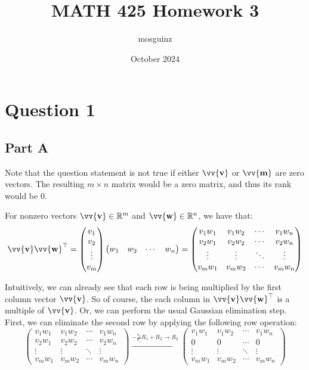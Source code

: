 \documentclass[12pt]{article}
\title{MATH 425 Homework 3}
\author{mosguinz}
\date{October 2024}
\newcommand{\vect}[1]{\vv{\mathbf{#1}}}
\newcommand{\R}{\mathbb{R}}
\begin{document}
\section*{Question 1}

\subsection*{Part A}

Note that the question statement is not true if either $\vect{v}$ or $\vect{m}$ are zero vectors. The resulting $m\times n$ matrix would be a zero matrix, and thus its rank would be $0$.

For nonzero vectors $\vect{v}\in\R^m$ and $\vect{w}\in\R^n$, we have that:
$$
\vect{v}\vect{w}^\top = \begin{pmatrix}
    v_1 \\ v_2 \\ \vdots \\ v_m
\end{pmatrix}
\begin{pmatrix}
    w_1 & w_2 & \cdots & w_n
\end{pmatrix}
= \begin{pmatrix}
    v_1w_1 & v_1w_2 & \cdots & v_1w_n \\
    v_2w_1 & v_2w_2 & \cdots & v_2w_n \\
    \vdots & \vdots & \ddots & \vdots \\
    v_mw_1 & v_mw_2 & \cdots & v_mw_n
\end{pmatrix}
$$

Intuitively, we can already see that each row is being multiplied by the first column vector $\vect{v}$. So of course, the each column in $\vect{v}\vect{w}^\top$ is a multiple of $\vect{v}$. Or, we can perform the usual Gaussian elimination step. First, we can eliminate the second row by applying the following row operation:
$$
\begin{pmatrix}
    v_1w_1 & v_1w_2 & \cdots & v_1w_n \\
    v_2w_1 & v_2w_2 & \cdots & v_2w_n \\
    \vdots & \vdots & \ddots & \vdots \\
    v_mw_1 & v_mw_2 & \cdots & v_mw_n
\end{pmatrix}
\xrightarrow{-\frac{v_2}{v_1}R_1+R_2 \to R_2}
\begin{pmatrix}
    v_1w_1 & v_1w_2 & \cdots & v_1w_n \\
    0 & 0 & \cdots & 0 \\
    \vdots & \vdots & \ddots & \vdots \\
    v_mw_1 & v_mw_2 & \cdots & v_mw_n
\end{pmatrix}
$$
\end{document}
